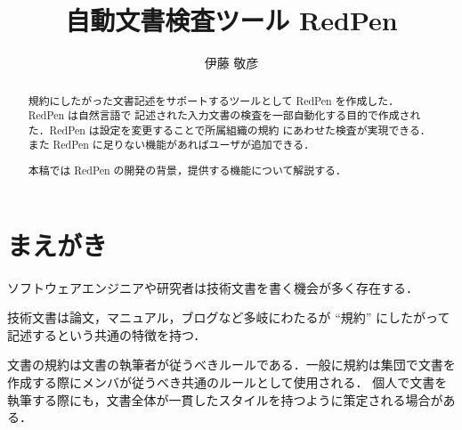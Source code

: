 \documentclass[a4paper, 10pt]{jarticle}
\title{自動文書検査ツール RedPen}
\author{伊藤 敬彦}
\begin{document}
\maketitle
\begin{abstract}
規約にしたがった文書記述をサポートするツールとして RedPen \cite{redpen} を作成した．RedPen は自然言語で
記述された入力文書の検査を一部自動化する目的で作成された．RedPen は設定を変更することで所属組織の規約
にあわせた検査が実現できる．また RedPen に足りない機能があればユーザが追加できる．

本稿では RedPen の開発の背景，提供する機能について解説する．
\end{abstract}

\section{まえがき}

ソフトウェアエンジニアや研究者は技術文書を書く機会が多く存在する．

技術文書は論文，マニュアル，ブログなど多岐にわたるが ``規約'' にしたがって記述するという共通の特徴を持つ．

文書の規約は文書の執筆者が従うべきルールである．一般に規約は集団で文書を作成する際にメンバが従うべき共通のルールとして使用される．
個人で文書を執筆する際にも，文書全体が一貫したスタイルを持つように策定される場合がある．



\end{document}
